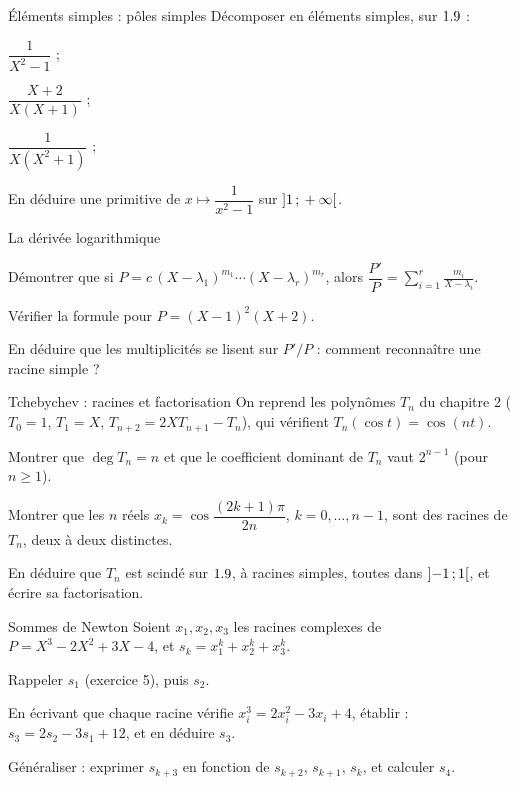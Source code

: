 \begin{exercice}[2]{Éléments simples : pôles simples}
Décomposer en éléments simples, sur $1.9$ :
\begin{questions}
  \item $\dfrac{1}{X^{2}-1}$ ;
  \item $\dfrac{X+2}{X(X+1)}$ ;
  \item $\dfrac{1}{X(X^{2}+1)}$ ;
  \item En déduire une primitive de $x\mapsto\dfrac{1}{x^{2}-1}$ sur
    $\mathopen{]}1\,{;}\,+\infty\mathclose{[}$.
\end{questions}
\end{exercice}

\begin{exercice}[2]{La dérivée logarithmique}
\begin{questions}
  \item Démontrer que si $P=c\,(X-\lambda_1)^{m_1}\cdots(X-\lambda_r)^{m_r}$,
    alors
    $\dfrac{P'}{P}=\displaystyle\sum_{i=1}^{r}\frac{m_i}{X-\lambda_i}$.
  \item Vérifier la formule pour $P=(X-1)^{2}(X+2)$.
  \item En déduire que les multiplicités se lisent sur $P'/P$ : comment
    reconnaître une racine simple ?
\end{questions}
\end{exercice}


\begin{exercice}[3]{Tchebychev : racines et factorisation}
On reprend les polynômes $T_n$ du chapitre 2
($T_0=1$, $T_1=X$, $T_{n+2}=2XT_{n+1}-T_n$), qui vérifient
$T_n(\cos t)=\cos(nt)$.
\begin{questions}
  \item Montrer que $\deg T_n=n$ et que le coefficient dominant de $T_n$
    vaut $2^{n-1}$ (pour $n\geq1$).
  \item Montrer que les $n$ réels
    $x_k=\cos\dfrac{(2k+1)\pi}{2n}$, $k=0,\dots,n-1$, sont des racines de
    $T_n$, deux à deux distinctes.
  \item En déduire que $T_n$ est scindé sur $1.9$, à racines simples,
    toutes dans $\mathopen{]}-1\,{;}\,1\mathclose{[}$, et écrire sa factorisation.
\end{questions}
\end{exercice}

\begin{exercice}[3]{Sommes de Newton}
Soient $x_1,x_2,x_3$ les racines complexes de $P=X^{3}-2X^{2}+3X-4$, et
$s_k=x_1^{k}+x_2^{k}+x_3^{k}$.
\begin{questions}
  \item Rappeler $s_1$ (exercice 5), puis $s_2$.
  \item En écrivant que chaque racine vérifie $x_i^{3}=2x_i^{2}-3x_i+4$,
    établir : $s_3=2s_2-3s_1+12$, et en déduire $s_3$.
  \item Généraliser : exprimer $s_{k+3}$ en fonction de $s_{k+2}$,
    $s_{k+1}$, $s_k$, et calculer $s_4$.
\end{questions}
\end{exercice}

